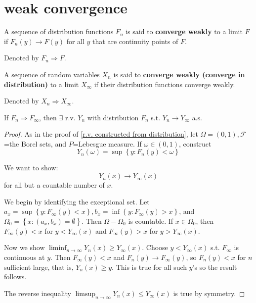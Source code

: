 \section{weak convergence}
\begin{definition}
A sequence of distribution functions $F_n$ is said to \textbf{converge weakly} to a limit $F$ if $F_n(y)\to F(y)$ for all $y$ that are continuity points of $F$. 
\end{definition}
\begin{remark}
Denoted by $F_n\Longrightarrow F$.
\end{remark}
\begin{definition}
A sequence of random variables $X_n$ is said to \textbf{converge weakly (converge in distribution)} to a limit $X_\infty$ if their distribution functions converge weakly.
\end{definition}
\begin{remark}
Denoted by $X_n\Longrightarrow X_\infty$.
\end{remark}
\begin{theorem}[Skorokhod]\label{Skorokhod}
If $F_n\Longrightarrow F_\infty$, then $\exists \text{ r.v. } Y_n$ with distribution $F_n$ s.t. $Y_n\longrightarrow Y_\infty$ a.s.
\end{theorem}
\begin{proof}
As in the proof of \ref{r.v. constructed from distribution}, let $\Omega=(0,1),\mathcal{F}$=the Borel sets, and $P$=Lebesgue measure. If $\omega\in(0,1)$, construct \[Y_n(\omega)=\sup\left \{ y:F_n(y)<\omega \right \} \]
\par We want to show: \[Y_n(x)\longrightarrow Y_\infty(x)\] for all but a countable number of $x$.
\par We begin by identifying the exceptional set. Let $a_x=\sup\left \{ y:F_\infty(y)<x \right \}, b_x=\inf\left \{ y:F_\infty(y)>x \right \}$, and $\Omega_0=\left \{ x:(a_x,b_x)=\emptyset \right \}$. Then $\Omega-\Omega_0$ is countable. If $x\in \Omega_0$, then $F_\infty(y)<x$ for $y<Y_\infty(x)$ and $F_\infty(y)>x$ for $y> Y_\infty(x)$.\par
Now we show $\liminf_{n\to\infty} Y_n(x)\ge Y_\infty(x)$. Choose $y<Y_\infty(x)$ s.t. $F_\infty$ is continuous at $y$.  Then  $F_\infty(y)<x$ and $F_n(y)\longrightarrow F_\infty(y)$, so $F_n(y)< x$ for $n$ sufficient large, that is, $Y_n(x)\ge y$. This is true for all such $y$'s so the result follows.\par
The reverse inequality $\limsup_{n\to\infty} Y_n(x)\le Y_\infty(x)$ is true by symmetry.
\end{proof}
